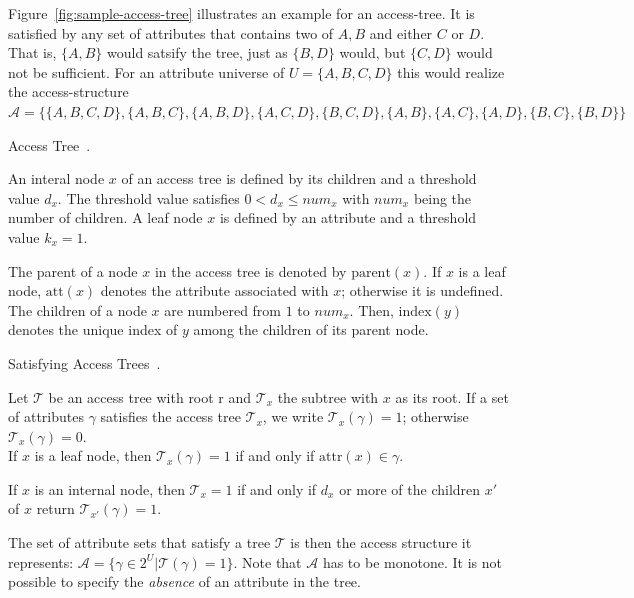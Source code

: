Figure~\ref{fig:sample-access-tree} illustrates an example for an \gls{access-tree}. It is satisfied by any set of attributes that contains two of $A, B$ and either $C$ or $D$.
That is, $\{A,B\}$ would satsify the tree, just as $\{B, D\}$ would, but $\{C, D\}$ would not be sufficient.
For an attribute universe of $U = \{A, B, C, D\}$ this would realize the \gls{access-structure} $\mathcal{A} = \{\{A, B, C, D\}, \{A, B, C\}, \{A, B, D\},\{A, C, D\}, \{B, C, D\}, \{A, B\},\{A, C\},\{A,D\}, \{B, C\},\{B, D\}\}$

\begin{definition}
    Access Tree~\cite{goyal_attribute-based_2006}.

    An interal node $x$ of an access tree is defined by its children and a threshold value $d_x$.
    The threshold value satisfies $0 < d_x \leq num_x$ with $num_x$ being the number of children.
    A leaf node $x$ is defined by an attribute and a threshold value $k_x = 1$.

    The parent of a node $x$ in the access tree is denoted by $\text{parent}(x)$.
    If $x$ is a leaf node, $\text{att}(x)$ denotes the attribute associated with $x$; otherwise it is undefined.
    The children of a node $x$ are numbered from $1$ to $num_x$. Then, $\text{index}(y)$ denotes the unique index of $y$ among the children of its parent node.
\end{definition}

\begin{definition}
    Satisfying Access Trees~\cite{goyal_attribute-based_2006}.

    Let $\mathcal{T}$ be an access tree with root r and $\mathcal{T}_x$ the subtree with $x$ as its root.
    If a set of attributes $\gamma$ satisfies the access tree $\mathcal{T}_x$, we write $\mathcal{T}_x(\gamma) = 1$; otherwise $\mathcal{T}_x(\gamma) = 0$.\\
    If $x$ is a leaf node, then $\mathcal{T}_x(\gamma) = 1$ if and only if $\text{attr}(x) \in \gamma$.
    
    If $x$ is an internal node, then $\mathcal{T}_x = 1$ if and only if $d_x$ or more of the children $x'$ of $x$ return $\mathcal{T}_{x'}(\gamma) = 1$.
\end{definition}
The set of attribute sets that satisfy a tree $\mathcal{T}$ is then the access structure it represents: $\mathcal{A} = \{\gamma \in 2^U | \mathcal{T}(\gamma) = 1\}$.
Note that $\mathcal{A}$ has to be monotone. It is not possible to specify the \emph{absence} of an attribute in the tree.

